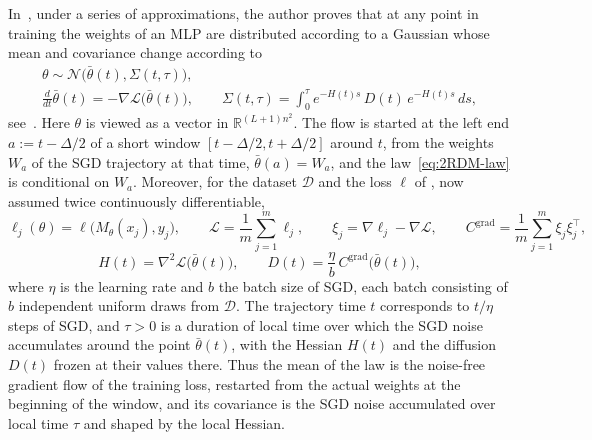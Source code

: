 \documentclass[11pt]{article}
\theoremstyle{remark}
\begin{document}
In~\cite{max-draft}, under a series of approximations, the author proves that at any point in training the weights of an MLP are distributed according to a Gaussian whose mean and covariance change according to 
\begin{equation} \label{eq:2RDM-law}
\begin{gathered}
    \theta \sim \mathcal{N}\big(\bar\theta(t), \Sigma(t, \tau)\big), \\
    \frac{d}{dt} \bar\theta(t) = -\nabla \mathcal{L}\big(\bar\theta(t)\big), \qquad
    \Sigma(t, \tau) = \int_0^\tau e^{-H(t) s}\, D(t)\, e^{-H(t) s} \, ds,
\end{gathered}
\end{equation}
see~\cite[Definition~2.1 and eq.~(67)]{max-draft}. Here $\theta$ is viewed as a vector in $\mathbb{R}^{(L+1) n^2}$. The flow is started at the left end $a := t - \Delta/2$ of a short window $[t - \Delta/2, t + \Delta/2]$ around $t$, from the weights $W_a$ of the SGD trajectory at that time, $\bar\theta(a) = W_a$, and the law~\eqref{eq:2RDM-law} is conditional on $W_a$. Moreover, for the dataset $\mathcal{D}$ and the loss $\ell$ of , now assumed twice continuously differentiable,
\[
    \ell_j(\theta) = \ell\big(M_\theta(x_j), y_j\big), \qquad
    \mathcal{L} = \frac{1}{m} \sum_{j=1}^{m} \ell_j, \qquad
    \xi_j = \nabla \ell_j - \nabla \mathcal{L}, \qquad
    C^{\mathrm{grad}} = \frac{1}{m} \sum_{j=1}^{m} \xi_j \xi_j^\top,
\]
\[
    H(t) = \nabla^2 \mathcal{L}\big(\bar\theta(t)\big), \qquad
    D(t) = \frac{\eta}{b}\, C^{\mathrm{grad}}\big(\bar\theta(t)\big),
\]
where $\eta$ is the learning rate and $b$ the batch size of SGD, each batch consisting of $b$ independent uniform draws from $\mathcal{D}$. The trajectory time $t$ corresponds to $t/\eta$ steps of SGD, and $\tau > 0$ is a duration of local time over which the SGD noise accumulates around the point $\bar\theta(t)$, with the Hessian $H(t)$ and the diffusion $D(t)$ frozen at their values there. Thus the mean of the law is the noise-free gradient flow of the training loss, restarted from the actual weights at the beginning of the window, and its covariance is the SGD noise accumulated over local time $\tau$ and shaped by the local Hessian.
\end{document}
